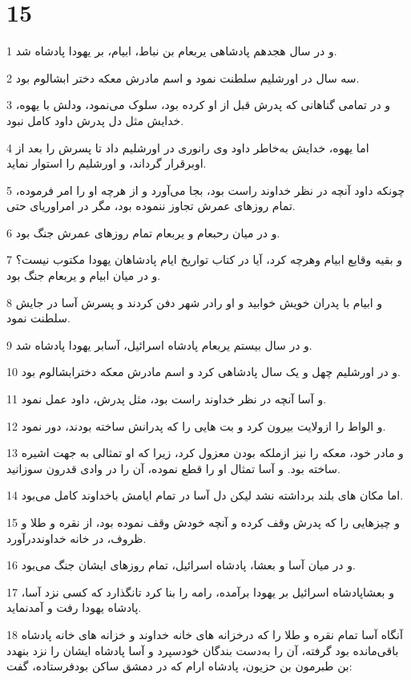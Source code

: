 \chapter{15}

\par 1 و در سال هجدهم پادشاهی یربعام بن نباط، ابیام، بر یهودا پادشاه شد.
\par 2 سه سال در اورشلیم سلطنت نمود و اسم مادرش معکه دختر ابشالوم بود.
\par 3 و در تمامی گناهانی که پدرش قبل از او کرده بود، سلوک می‌نمود، ودلش با یهوه، خدایش مثل دل پدرش داود کامل نبود.
\par 4 اما یهوه، خدایش به‌خاطر داود وی رانوری در اورشلیم داد تا پسرش را بعد از اوبرقرار گرداند، و اورشلیم را استوار نماید.
\par 5 چونکه داود آنچه در نظر خداوند راست بود، بجا می‌آورد و از هرچه او را امر فرموده، تمام روزهای عمرش تجاوز ننموده بود، مگر در امراوریای حتی.
\par 6 و در میان رحبعام و یربعام تمام روزهای عمرش جنگ بود.
\par 7 و بقیه وقایع ابیام وهرچه کرد، آیا در کتاب تواریخ ایام پادشاهان یهودا مکتوب نیست؟ و در میان ابیام و یربعام جنگ بود.
\par 8 و ابیام با پدران خویش خوابید و او رادر شهر دفن کردند و پسرش آسا در جایش سلطنت نمود.
\par 9 و در سال بیستم یربعام پادشاه اسرائیل، آسابر یهودا پادشاه شد.
\par 10 و در اورشلیم چهل و یک سال پادشاهی کرد و اسم مادرش معکه دخترابشالوم بود.
\par 11 و آسا آنچه در نظر خداوند راست بود، مثل پدرش، داود عمل نمود.
\par 12 و الواط را ازولایت بیرون کرد و بت هایی را که پدرانش ساخته بودند، دور نمود.
\par 13 و مادر خود، معکه را نیز ازملکه بودن معزول کرد، زیرا که او تمثالی به جهت اشیره ساخته بود. و آسا تمثال او را قطع نموده، آن را در وادی قدرون سوزانید.
\par 14 اما مکان های بلند برداشته نشد لیکن دل آسا در تمام ایامش باخداوند کامل می‌بود.
\par 15 و چیزهایی را که پدرش وقف کرده و آنچه خودش وقف نموده بود، از نقره و طلا و ظروف، در خانه خداونددرآورد.
\par 16 و در میان آسا و بعشا، پادشاه اسرائیل، تمام روزهای ایشان جنگ می‌بود.
\par 17 و بعشاپادشاه اسرائیل بر یهودا برآمده، رامه را بنا کرد تانگذارد که کسی نزد آسا، پادشاه یهودا رفت و آمدنماید.
\par 18 آنگاه آسا تمام نقره و طلا را که درخزانه های خانه خداوند و خزانه های خانه پادشاه باقی‌مانده بود گرفته، آن را به‌دست بندگان خودسپرد و آسا پادشاه ایشان را نزد بنهدد بن طبرمون بن حزیون، پادشاه ارام که در دمشق ساکن بودفرستاده، گفت:
